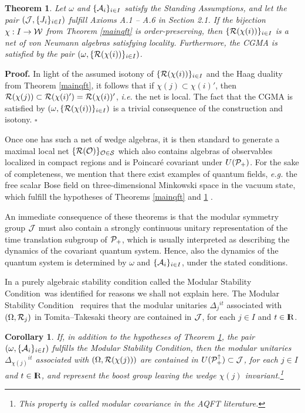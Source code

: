 \documentclass[a4paper,twoside,12pt]{article}
\newtheorem{theorem}{Theorem}[section]
\newtheorem{cor}{Corollary}[section]
\newenvironment{proof}{\medskip \noindent 
            {\bf Proof.}}{ \hfill $\square$ \medskip}
\def\inet{{\{\As_i \}_{i \in I}}}
\def\rnet{{\{\Rs(\Os)\}_{\Os\in\Ss}}}
\def\msc{{Modular Stability Condition}}
\def\As{{\cal A}}
\def\Js{{\cal J}}
\def\Os{{\cal O}}
\def\Ps{{\cal P}}
\def\Rs{{\cal R}}
\def\Ss{{\cal S}}
\def\Ws{{\cal W}}
\def\Pid{{\Ps_+ ^{\uparrow}}}
\def\RR{\textnormal{{\rm I \hskip -5.75pt R}}}
\def\Pid{{\Ps_+ ^{\uparrow}}}
\begin{document}
\begin{theorem} \label{mainqft2} Let $\omega$ and $\inet$ satisfy the
Standing Assumptions, and let the pair $(\Js,\{ J_i \}_{i \in I})$
fulfill Axioms A.1 -- A.6 in Section 2.1. If the bijection 
$\chi : I \rightarrow \Ws$ from Theorem \ref{mainqft} is order-preserving, 
then $\{ \Rs(\chi(i)) \}_{i \in I}$ is a net of von Neumann algebras 
satisfying locality. Furthermore, the CGMA is satisfied by the pair 
$(\omega,\{ \Rs(\chi(i)) \}_{i \in I})$.
\end{theorem}

\begin{proof} In light of the assumed isotony of 
$\{ \Rs(\chi(i)) \}_{i \in I}$ and the Haag duality from 
Theorem \ref{mainqft}, it follows that if 
$\chi(j) \subset \chi(i)'$, then 
$\Rs(\chi(j)) \subset \Rs(\chi(i)') = \Rs(\chi(i))'$, {\it i.e.} the
net is local. The fact that the CGMA is
satisfied by $(\omega,\{ \Rs(\chi(i)) \}_{i \in I})$ is a trivial
consequence of the construction and isotony.
\end{proof}

     Once one has such a net of wedge algebras, it is then standard
\cite{BW} to generate a maximal local net $\rnet$ which also contains
algebras of observables localized in compact regions and is
Poincar\'e covariant under $U(\Ps_+)$.  For the sake of completeness,
we mention that there exist examples of quantum fields, {\it e.g.} the
free scalar Bose field on three-dimensional Minkowski space in the
vacuum state, which fulfill the hypotheses of Theorems \ref{mainqft}
and \ref{mainqft2} \cite{Wh}.
 
     An immediate consequence of these theorems is that the
modular symmetry group $\Js$ must also contain a strongly continuous
unitary representation of the time translation subgroup of $\Ps_+$,
which is usually interpreted as describing the dynamics of the
covariant quantum system. Hence, also the dynamics of the quantum
system is determined by $\omega$ and $\inet$, under the stated 
conditions.

     In \cite{BDFS} a purely algebraic stability condition called the
\msc \ was identified for reasons we shall not explain here.  The \msc
\ requires that the modular unitaries
$\Delta_j{}^{it}$ associated with $(\Omega,\Rs_j)$ in Tomita--Takesaki
theory are contained in $\Js$, for each $j \in I$ and $t \in \RR$.

\begin{cor} If, in addition to the hypotheses of Theorem 
\ref{mainqft2}, the pair $(\omega,\inet)$ fulfills the \msc,
then the modular unitaries $\Delta_{\chi(j)}{}^{it}$ associated with
$(\Omega,\Rs(\chi(j)))$ are contained in $U(\Pid) \subset \Js$, 
for each $j \in I$ and $t \in \RR$, and represent the boost group
leaving the wedge $\chi(j)$ invariant.\footnote{This property is 
called modular covariance in the AQFT literature.}
\end{cor}
\end{document}

